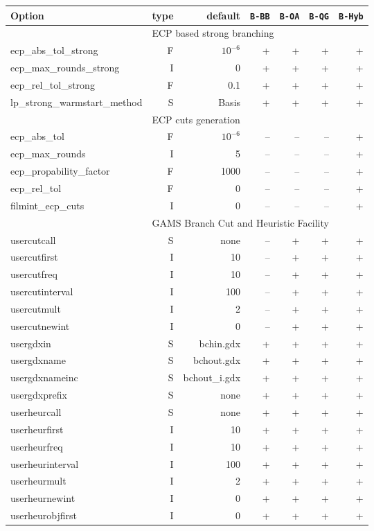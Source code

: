 \begin{center}
\begin{tabular}{|l|r|r|r|r|r|r|}\hline
Option & type &  default & {\tt B-BB} & {\tt B-OA} & {\tt B-QG} & {\tt B-Hyb} \\
\hline
\hline
\multicolumn{1}{|c}{} & \multicolumn{6}{l|}{ECP based strong branching}\\
\hline
ecp\_abs\_tol\_strong& F& $10^{-6}$& +& +& +& +\\
ecp\_max\_rounds\_strong& I& 0& +& +& +& +\\
ecp\_rel\_tol\_strong& F& 0.1& +& +& +& +\\
lp\_strong\_warmstart\_method& S& Basis& +& +& +& +\\
\hline
\multicolumn{1}{|c}{} & \multicolumn{6}{l|}{ECP cuts generation}\\
\hline
ecp\_abs\_tol& F& $10^{-6}$&--&--&--& +\\
ecp\_max\_rounds& I& 5&--&--&--& +\\
ecp\_propability\_factor& F& 1000&--&--&--& +\\
ecp\_rel\_tol& F& 0&--&--&--& +\\
filmint\_ecp\_cuts& I& 0&--&--&--& +\\
\hline
\multicolumn{1}{|c}{} & \multicolumn{6}{l|}{GAMS Branch Cut and Heuristic Facility}\\
\hline
usercutcall& S& none& --& +& +& +\\
usercutfirst& I& 10& --& +& +& +\\
usercutfreq& I& 10& --& +& +& +\\
usercutinterval& I& 100& --& +& +& +\\
usercutmult& I& 2& --& +& +& +\\
usercutnewint& I& 0& --& +& +& +\\
usergdxin& S& bchin.gdx& +& +& +& +\\
usergdxname& S& bchout.gdx& +& +& +& +\\
usergdxnameinc& S& bchout\_i.gdx& +& +& +& +\\
usergdxprefix& S&none & +& +& +& +\\
userheurcall& S& none& +& +& +& +\\
userheurfirst& I& 10& +& +& +& +\\
userheurfreq& I& 10& +& +& +& +\\
userheurinterval& I& 100& +& +& +& +\\
userheurmult& I& 2& +& +& +& +\\
userheurnewint& I& 0& +& +& +& +\\
userheurobjfirst& I& 0& +& +& +& +\\

\end{tabular}
\end{center}
